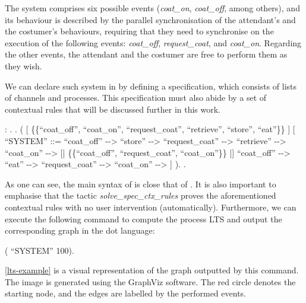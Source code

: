 The system comprises six possible events (\emph{coat\_on}, \emph{coat\_off}, among others), and its behaviour is described by the parallel synchronisation of the attendant's and the costumer's behaviours, requiring that they need to synchronise on the execution of the following events: \emph{coat\_off}, \emph{request\_coat}, and \emph{coat\_on}. Regarding the other events, the attendant and the costumer are free to perform them as they wish.

We can declare such system in \CSPcoq{} by defining a specification, which consists of lists of channels and processes. This specification must also abide by a set of contextual rules that will be discussed further in this work.

\begin{coqdoccode}
	\coqdocnoindent
	  : .\coqdoceol
	\coqdocnoindent
	.\coqdoceol
	\coqdocindent{1.00em}
	 (\coqdoceol
	\coqdocindent{2.00em}
	\coqdoceol
	\coqdocindent{2.00em}
	[  \{\{``coat\_off'', ``coat\_on'', ``request\_coat'', ``retrieve'', ``store'', ``eat''\}\} ]\coqdoceol
	\coqdocindent{2.00em}
	[ ``SYSTEM'' ::=\coqdoceol
	\coqdocindent{3.00em}
	``coat\_off'' -{}-> ``store'' -{}-> ``request\_coat'' -{}-> ``retrieve'' -{}-> ``coat\_on'' -{}-> \coqdoceol
	\coqdocindent{3.00em}
	[| \{\{``coat\_off'', ``request\_coat'', ``coat\_on''\}\} |]\coqdoceol
	\coqdocindent{3.00em}
	``coat\_off'' -{}-> ``eat'' -{}-> ``request\_coat'' -{}-> ``coat\_on'' -{}->  ]\coqdoceol
	\coqdocindent{1.00em}
	).\coqdoceol
	\coqdocnoindent
	.\coqdoceol
\end{coqdoccode}

As one can see, the main syntax of \CSPcoq{} is close that of \CSPM{}. It is also important to emphasise that the tactic \emph{solve\_spec\_ctx\_rules} proves the aforementioned contextual rules with no user intervention (automatically). Furthermore, we can execute the following command to compute the process LTS and output the corresponding graph in the dot language:

\begin{coqdoccode}
	\coqdocnoindent
	  (  ``SYSTEM'' 100).\coqdoceol
\end{coqdoccode}

\autoref{lts-example} is a visual representation of the graph outputted by this command. The image is generated using the GraphViz software. The red circle denotes the starting node, and the edges are labelled by the performed events.

